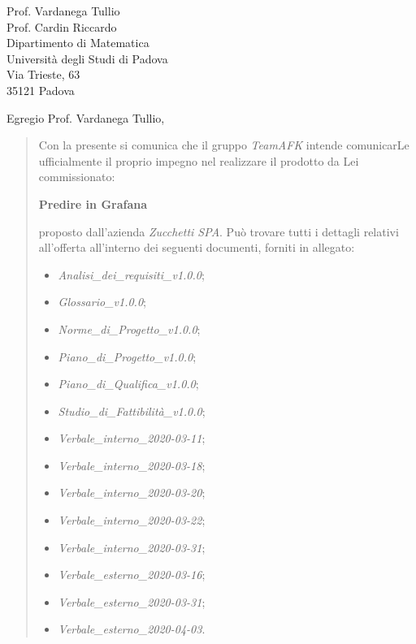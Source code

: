 \begin{letter}{
		Prof. Vardanega Tullio \\
		Prof. Cardin Riccardo \\
		Dipartimento di Matematica \\
		Università degli Studi di Padova \\
		Via Trieste, 63 \\
		35121 Padova}
		
\opening{Egregio Prof. Vardanega Tullio,}

\begin{quotation}
Con la presente si comunica che il gruppo \textit{TeamAFK} intende 
comunicarLe ufficialmente il proprio impegno nel realizzare il prodotto da Lei 
commissionato:

\begin{center}
	\textbf{Predire in Grafana}
\end{center}

\noindent proposto dall'azienda \textit{Zucchetti SPA}.
Può trovare tutti i dettagli relativi all'offerta all'interno dei seguenti 
documenti, forniti in allegato:

\begin{itemize}
	\item \textit{Analisi\_dei\_requisiti\_v1.0.0};
	
	\item \textit{Glossario\_v1.0.0};
	
	\item \textit{Norme\_di\_Progetto\_v1.0.0};

	\item \textit{Piano\_di\_Progetto\_v1.0.0};

	\item \textit{Piano\_di\_Qualifica\_v1.0.0};

	\item \textit{Studio\_di\_Fattibilità\_v1.0.0};

	\item \textit{Verbale\_interno\_2020-03-11};
	\item \textit{Verbale\_interno\_2020-03-18};
	\item \textit{Verbale\_interno\_2020-03-20};
	\item \textit{Verbale\_interno\_2020-03-22};
	\item \textit{Verbale\_interno\_2020-03-31};
	\item \textit{Verbale\_esterno\_2020-03-16};
	\item \textit{Verbale\_esterno\_2020-03-31};
	\item \textit{Verbale\_esterno\_2020-04-03}.
\end{itemize}


\end{quotation}
\end{letter}
